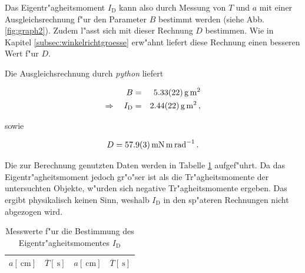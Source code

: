 		Das Eigentr"agheitsmoment $I_\mathrm{D}$ kann also durch Messung von $T$ und $a$ mit einer Ausgleichsrechnung f"ur den Parameter $B$ bestimmt werden (siehe Abb. \ref{fig:graph2}).
		Zudem l"asst sich mit dieser Rechnung $D$ bestimmen.
		Wie in Kapitel \ref{subsec:winkelrichtgroesse} erw"ahnt liefert diese Rechnung einen besseren Wert f"ur $D$.

		Die Ausgleichsrechnung durch \emph{python} liefert

		\begin{eqnarray*}
			B & = & \SI{5.33 (22)}{\gram \meter \squared} \\
			\Rightarrow \quad I_\mathrm{D} & = & \SI{2.44 (22)}{\gram \meter \squared} \,,
		\end{eqnarray*}

		sowie

		\begin{equation*}
			D = \SI{57.9 (3)}{\milli \newton \meter \per \radian} \,.
		\end{equation*}

		Die zur Berechnung genutzten Daten werden in Tabelle \ref{tabelle:eigentraegheitsmoment} aufgef"uhrt.
		Da das Eigentr"agheitsmoment jedoch gr"o"ser ist als die Tr"agheitsmomente der untersuchten Objekte, w"urden sich negative Tr"agheitsmomente ergeben.
		Das ergibt physikalisch keinen Sinn, weshalb $I_\mathrm{D}$ in den sp"ateren Rechnungen nicht abgezogen wird.

		\begin{table}[h!]
			\begin{center}
				\caption{Messwerte f"ur die Bestimmung des Eigentr"agheitsmomentes $I_\mathrm{D}$ \label{tabelle:eigentraegheitsmoment}}
				\begin{tabular}{|c|c||c|c|}
					\hline
					$a [\SI{}{\centi \meter}]$ & $\overline{T} [\SI{}{\second}]$ & $a [\SI{}{\centi \meter}]$ & $\overline{T} [\SI{}{\second}]$\\
					\hline 
					\hline
					
					\hline 
				\end{tabular}
			\end{center}
		\end{table}

		\clearpage

